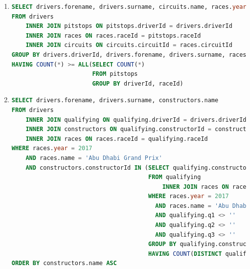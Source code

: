 \documentclass{db-practice}
\begin{document}
\begin{enumerate}
\item
\begin{lstlisting}[language=SQL]
SELECT drivers.forename, drivers.surname, circuits.name, races.year, COUNT(*)
FROM drivers
    INNER JOIN pitstops ON pitstops.driverId = drivers.driverId
    INNER JOIN races ON races.raceId = pitstops.raceId
    INNER JOIN circuits ON circuits.circuitId = races.circuitId
GROUP BY drivers.driverId, drivers.forename, drivers.surname, races.raceId, races.year, circuits.name
HAVING COUNT(*) >= ALL(SELECT COUNT(*)
                       FROM pitstops
                       GROUP BY driverId, raceId)
\end{lstlisting}
 
\item
\begin{lstlisting}[language=SQL]
SELECT drivers.forename, drivers.surname, constructors.name
FROM drivers
    INNER JOIN qualifying ON qualifying.driverId = drivers.driverId
    INNER JOIN constructors ON qualifying.constructorId = constructors.constructorId
    INNER JOIN races ON races.raceId = qualifying.raceId
WHERE races.year = 2017
    AND races.name = 'Abu Dhabi Grand Prix'
    AND constructors.constructorId IN (SELECT qualifying.constructorId
                                       FROM qualifying
                                           INNER JOIN races ON races.raceId = qualifying.raceId
                                       WHERE races.year = 2017
                                         AND races.name = 'Abu Dhabi Grand Prix'
                                         AND qualifying.q1 <> ''
                                         AND qualifying.q2 <> ''
                                         AND qualifying.q3 <> ''
                                       GROUP BY qualifying.constructorId
                                       HAVING COUNT(DISTINCT qualifying.driverId) = 2)
ORDER BY constructors.name ASC
\end{lstlisting}


\end{enumerate}
\end{document}
